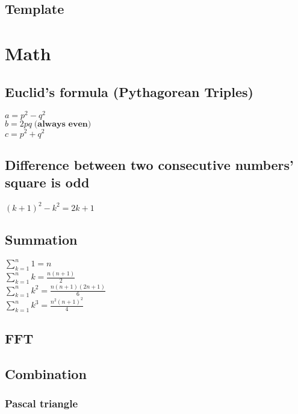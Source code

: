 \documentclass[10pt,oneside]{article}
\begin{document}
\begin{landscape}
\begin{multicols}{2}
\subsection{Template}


\section{Math}

\subsection{Euclid's formula (Pythagorean Triples)}

$a = p^2 - q^2 $\\
$b = 2pq \; \textbf{(always even)}$ \\
$c = p^2 + q^2$\\

\subsection{Difference between two consecutive numbers' square is odd}

$(k + 1)^2 - k^2 = 2k + 1$

\subsection{Summation}

$\sum_{k=1}^{n} 1= n$\\
$\sum_{k=1}^{n} k= \frac{n(n+1)}{2}$\\
$\sum_{k=1}^{n} k^2= \frac{n(n+1)(2n+1)}{6}$\\
$\sum_{k=1}^{n} k^3= \frac{n^2(n+1)^2}{4}$\\

\subsection{FFT}

\subsection{Combination}

\subsubsection{Pascal triangle}


\end{multicols}
\end{landscape}
\end{document}
